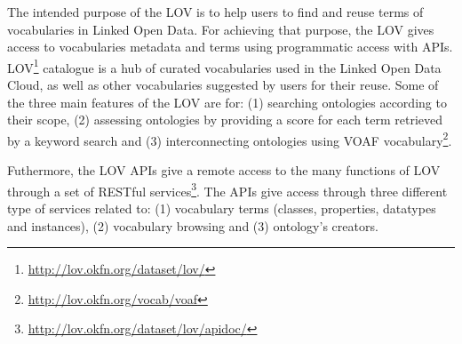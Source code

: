 The intended purpose of the LOV \cite{vandenbusschelov} is to help users to find and reuse terms of vocabularies in Linked Open Data. For achieving that purpose, the LOV gives access to vocabularies metadata and terms using programmatic access with APIs.  
LOV\footnote{\url{http://lov.okfn.org/dataset/lov/}} catalogue is a hub of curated vocabularies used in the Linked Open Data Cloud, as well as other vocabularies suggested by users for their reuse. 
Some of the three main features of the LOV are for: (1) searching ontologies according to their scope, (2) assessing ontologies by providing a score for each term retrieved by a keyword search and (3) interconnecting ontologies using VOAF vocabulary\footnote{\url{http://lov.okfn.org/vocab/voaf}}.


Futhermore, the LOV APIs give a remote access to the many functions of LOV through a set of RESTful services\footnote{\url{http://lov.okfn.org/dataset/lov/apidoc/}}. %
The APIs give access through three different type of services related to: (1) vocabulary terms (classes, properties, datatypes and instances), (2) vocabulary browsing and (3) ontology's creators. 



